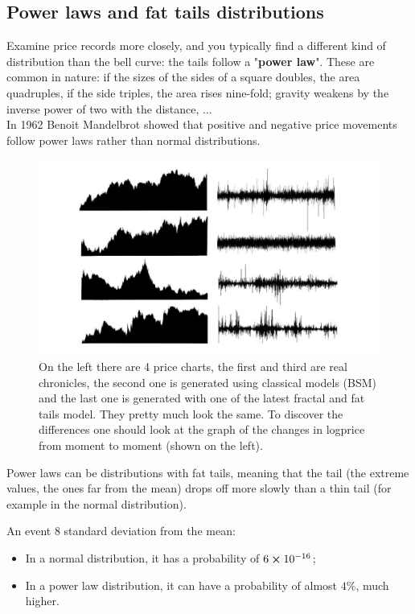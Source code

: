 \subsection{Power laws and fat tails distributions}
Examine price records more closely, and you typically find a different kind of distribution than the bell curve: the tails follow a "\textbf{power law}". These are common in nature: if the sizes of the sides of a square doubles, the area quadruples, if the side triples, the area rises nine-fold; gravity weakens by the inverse power of two with the distance, ...\\

In 1962 Benoit Mandelbrot showed that positive and negative price movements follow power laws rather than normal distributions.
\begin{figure} [H]
    \centering
    \includegraphics[width=1\linewidth]{img/market_comparison.jpg}
    \caption{On the left there are 4 price charts, the first and third are real chronicles, the second one is generated using classical models (BSM) and the last one is generated with one of the latest fractal and fat tails model. They pretty much look the same. To discover the differences one should look at the graph of the changes in logprice from moment to moment (shown on the left).}
\end{figure}
Power laws can be distributions with fat tails, meaning that the tail (the extreme values, the ones far from the mean) drops off more slowly than a thin tail (for example in the normal distribution).

An event 8 standard deviation from the mean:
\begin{itemize}
    \item In a normal distribution, it has a probability of $6 \cross 10^{-16}$;
    \item In a power law distribution, it can have a probability of almost $4 \%$, much higher.
\end{itemize}

